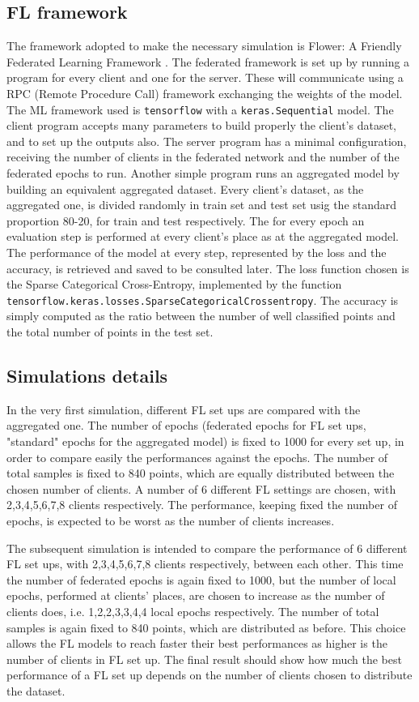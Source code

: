 \documentclass{article} %
\newcounter{points}
\newcounter{other}
\newcounter{late}
\begin{document}
\subsection{FL framework}
The framework adopted to make the necessary simulation is Flower: A Friendly Federated 
Learning Framework \cite{beutel2021flower}.
The federated framework is set up by running a program for every client and one for 
the server.
These will communicate using a RPC (Remote Procedure Call) framework exchanging the 
weights of the model.
The ML framework used is \verb|tensorflow| with a \verb|keras.Sequential| model.
The client program accepts many parameters to build properly the client's dataset, and 
to set up the outputs also.
The server program has a minimal configuration, receiving the number of clients in the 
federated network and the number of the federated epochs to run.
Another simple program runs an aggregated model by building an equivalent aggregated 
dataset.
Every client's dataset, as the aggregated one, is divided randomly in train set and test 
set usig the standard proportion 80-20, for train and test respectively.
The for every epoch an evaluation step is performed at every client's place as at the 
aggregated model.
The performance of the model at every step, represented by the loss and the accuracy, 
is retrieved and saved to be consulted later.
The loss function chosen is the Sparse Categorical Cross-Entropy, implemented by the
function \verb|tensorflow.keras.losses.SparseCategoricalCrossentropy|.
The accuracy is simply computed as the ratio between the number of well classified points 
and the total number of points in the test set.

\subsection {Simulations details}
In the very first simulation, different FL set ups are compared with the aggregated one.
The number of epochs (federated epochs for FL set ups, "standard" epochs for the aggregated 
model) is fixed to 1000 for every set up, in order to compare easily the performances 
against the epochs.
The number of total samples is fixed to 840 points, which are equally distributed between the 
chosen number of clients.
A number of 6 different FL settings are chosen, with 2,3,4,5,6,7,8 clients respectively.
The performance, keeping fixed the number of epochs, is expected to be worst as the number 
of clients increases.

The subsequent simulation is intended to compare the performance of 6 different FL set ups, 
with 2,3,4,5,6,7,8 clients respectively, between each other.
This time the number of federated epochs is again fixed to 1000, but the number of local epochs,
performed at clients' places, are chosen to increase as the number of clients does, i.e. 1,2,2,3,3,4,4 
local epochs respectively.
The number of total samples is again fixed to 840 points, which are distributed as before.
This choice allows the FL models to reach faster their best performances as higher is the number of 
clients in FL set up.
The final result should show how much the best performance of a FL set up depends on the 
number of clients chosen to distribute the dataset.
\end{document}
